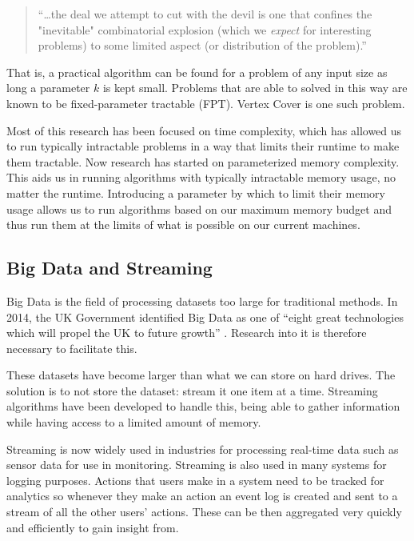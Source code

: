 \begin{quote}
    ``\dots the deal we attempt to cut with the devil is one that confines the
    "inevitable" combinatorial explosion (which we \textit{expect} for
    interesting problems) to some limited aspect (or distribution of the
    problem).''
\end{quote}

That is, a practical algorithm can be found for a problem of any input size as
long a parameter \(k\) is kept small. Problems that are able to solved in this
way are known to be fixed-parameter tractable (FPT). Vertex Cover is one such
problem.

Most of this research has been focused on time complexity, which has allowed us
to run typically intractable problems in a way that limits their runtime to
make them tractable. Now research has started on parameterized memory
complexity. This aids us in running algorithms with typically intractable
memory usage, no matter the runtime. Introducing a parameter by which to limit
their memory usage allows us to run algorithms based on our maximum memory
budget and thus run them at the limits of what is possible on our current
machines.

\subsection{Big Data and Streaming}

Big Data is the field of processing datasets too large for traditional methods.
In 2014, the UK Government identified Big Data as one of ``eight great
technologies which will propel the UK to future growth''
\cite{intellectualpropertyoffice2014}. Research into it is therefore necessary
to facilitate this.

These datasets have become larger than what we can store on hard drives. The
solution is to not store the dataset: stream it one item at a time. Streaming
algorithms have been developed to handle this, being able to gather information
while having access to a limited amount of memory.

Streaming is now widely used in industries for processing real-time data such
as sensor data for use in monitoring. Streaming is also used in many systems
for logging purposes. Actions that users make in a system need to be tracked
for analytics so whenever they make an action an event log is created and sent
to a stream of all the other users' actions. These can be then aggregated very
quickly and efficiently to gain insight from.

